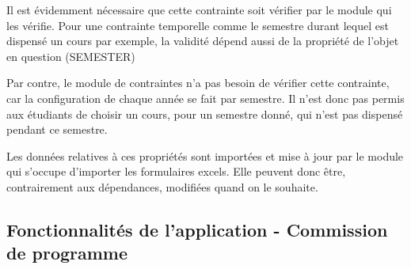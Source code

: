 Il est évidemment nécessaire que cette contrainte soit vérifier par le module qui les vérifie. Pour une contrainte temporelle comme le semestre durant lequel est dispensé un cours par exemple, la validité dépend aussi de la propriété de l'objet en question (SEMESTER)

Par contre, le module de contraintes n'a pas besoin de vérifier cette contrainte, car la configuration de chaque année se fait par semestre. Il n'est donc pas permis aux étudiants de choisir un cours, pour un semestre donné, qui n'est pas dispensé pendant ce semestre. 

Les données relatives à ces propriétés sont importées et mise à jour par le module qui s'occupe d'importer les formulaires excels. Elle peuvent donc être, contrairement aux dépendances, modifiées quand on le souhaite.  
\subsection{Fonctionnalités de l'application - Commission de programme}

